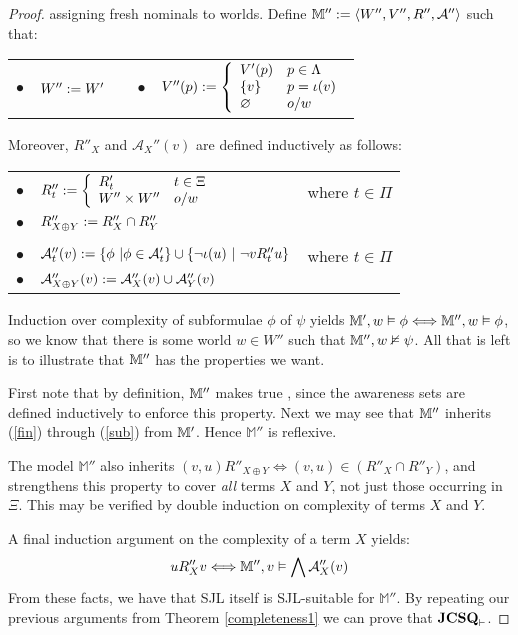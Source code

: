 \begin{proof}
  assigning fresh nominals to worlds.  Define $\mathbbm{M}'' \assign \langle W'',
  V'', R'', \mathcal{A}'' \rangle$ such that:
  \begin{center}
    \begin{tabular}{lllll}
      $\bullet$ & $W'' \assign W'$ &  & $\bullet$ & $V'' (p) \assign \left\{
      \begin{array}{ll}
        V' (p) & p \in \Lambda\\
        \{v\} & p = \iota (v)\\
        \varnothing & o / w
      \end{array} \right.$
    \end{tabular}
  \end{center}
Moreover,  $R''_X$ and $\mathcal{A}_X'' (v)$ are defined inductively as follows:
  \begin{center}
    \begin{tabular}{lll}
      $\bullet$ & $R''_t \assign \left\{ \begin{array}{ll}
        R'_t & t \in \Xi\\
        W'' \times W'' & o / w
      \end{array} \right.$ & where $t \in \Pi$ \\
      $\bullet$ & $R''_{X \oplus Y} \assign R''_X \cap R''_Y$ & \\
      &  & \\
      $\bullet$ & $\mathcal{A}''_t (v) \assign \{\phi \  | \phi \in
      \mathcal{A}'_t \} \cup \{\neg \iota (u) \  | \ 
      \neg v R''_t u\}$ & where $t \in \Pi$\\
      $\bullet$ & $\mathcal{A}''_{X \oplus Y} (v) \assign \mathcal{A}''_{X} (v)
      \cup \mathcal{A}''_Y (v)$ & 
    \end{tabular}
  \end{center}
  Induction over complexity of subformulae $\phi$ of $\psi$ yields
  $\mathbbm{M}', w \vDash \phi \Longleftrightarrow \mathbbm{M}'', w \vDash
  \phi$, so we know that there is some world $w \in W''$ such that
  $\mathbbm{M}'', w \nvDash \psi$.  All that is left is to illustrate that
  $\mathbbm{M}''$ has the properties we want.
  
  First note that by definition, $\mathbbm{M}''$ makes true
  , since the awareness sets are defined inductively
  to enforce this property. Next we may see that $\mathbbm{M}''$
  inherits (\ref{fin}) through (\ref{sub}) from $\mathbbm{M}'$.  Hence
  $\mathbb{M}''$ is reflexive.  

  The model $\mathbb{M}''$ also inherits $(v,u) R''_{X \oplus Y} \iff
  (v,u) \in  (R''_{X}\cap R''_{Y})$,
  and strengthens this property to cover \emph{all} terms $X$ and $Y$,
  not just those occurring in $\Xi$. This may
  be verified by double induction on complexity of terms $X$ and $Y$.

  A final induction argument on the complexity of a term $X$ yields:
  \[ u R_X'' v \Longleftrightarrow \mathbbm{M}'', v \vDash \bigwedge
     \mathcal{A}''_X (v) \]
  From these facts, we have that SJL itself is SJL-suitable for $\mathbb{M}''$. By repeating our previous arguments
  from Theorem \ref{completeness1} we can prove that $\textup{\tmtextbf{JCSQ}}_\vdash$.
\end{proof}

